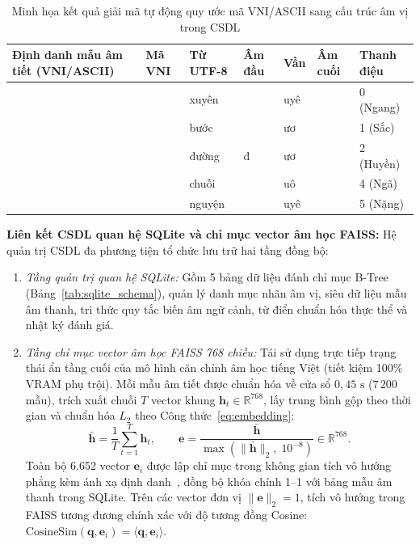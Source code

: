 \documentclass[12pt,a4paper]{article}
\begin{document}
\begin{table}[!htbp]
\centering
\caption{Minh họa kết quả giải mã tự động quy ước mã VNI/ASCII sang cấu trúc âm vị trong CSDL}
\label{tab:vni_decode}
\setlength{\tabcolsep}{3.0pt}
\begin{tabularx}{\linewidth}{Y C{2.1cm} C{1.45cm} C{1.15cm} C{1.05cm} C{1.15cm} C{1.95cm}}
\toprule
Định danh mẫu âm tiết (VNI/ASCII) & Mã VNI & Từ UTF-8 & Âm đầu & Vần & Âm cuối & Thanh điệu \\
\midrule
{\scriptsize{}} & {\footnotesize{}} & xuyên &  & uyê &  & 0 (Ngang) \\
{\scriptsize{}} & {\footnotesize{}} & bước &  & ươ &  & 1 (Sắc) \\
{\scriptsize{}} & {\footnotesize{}} & đường & đ & ươ &  & 2 (Huyền) \\
{\scriptsize{}} & {\footnotesize{}} & chuỗi &  & uô &  & 4 (Ngã) \\
{\scriptsize{}} & {\footnotesize{}} & nguyện &  & uyê &  & 5 (Nặng) \\
\bottomrule
\end{tabularx}
\end{table}

\textbf{Liên kết CSDL quan hệ SQLite và chỉ mục vector âm học FAISS:} Hệ quản trị CSDL đa phương tiện tổ chức lưu trữ hai tầng đồng bộ:
\begin{enumerate}
  \item \textit{Tầng quản trị quan hệ SQLite:} Gồm 5 bảng dữ liệu đánh chỉ mục B-Tree (Bảng~\ref{tab:sqlite_schema}), quản lý danh mục nhãn âm vị, siêu dữ liệu mẫu âm thanh, tri thức quy tắc biến âm ngữ cảnh, từ điển chuẩn hóa thực thể và nhật ký đánh giá.
  \item \textit{Tầng chỉ mục vector âm học FAISS 768 chiều:} Tái sử dụng trực tiếp trạng thái ẩn tầng cuối của mô hình căn chỉnh âm học tiếng Việt (tiết kiệm 100\% VRAM phụ trội). Mỗi mẫu âm tiết được chuẩn hóa về cửa sổ $0{,}45\text{ s}$ ($7\,200$ mẫu), trích xuất chuỗi $T$ vector khung $\mathbf{h}_t \in \mathbb{R}^{768}$, lấy trung bình gộp theo thời gian và chuẩn hóa $L_2$ theo Công thức~\eqref{eq:embedding}:
  \begin{equation}
  \bar{\mathbf{h}} = \frac{1}{T} \sum_{t=1}^{T} \mathbf{h}_t, \qquad \mathbf{e} = \frac{\bar{\mathbf{h}}}{\max\left(\lVert\bar{\mathbf{h}}\rVert_2,\; 10^{-8}\right)} \in \mathbb{R}^{768}.
  \label{eq:embedding}
  \end{equation}
  Toàn bộ 6.652 vector $\mathbf{e}_i$ được lập chỉ mục trong không gian tích vô hướng phẳng kèm ánh xạ định danh~\cite{johnson2019faiss}, đồng bộ khóa chính 1--1 với bảng mẫu âm thanh trong SQLite. Trên các vector đơn vị $\lVert\mathbf{e}\rVert_2 = 1$, tích vô hướng trong FAISS tương đương chính xác với độ tương đồng Cosine: $\mathrm{CosineSim}(\mathbf{q}, \mathbf{e}_i) = \langle \mathbf{q}, \mathbf{e}_i \rangle$.
\end{enumerate}
\end{document}
